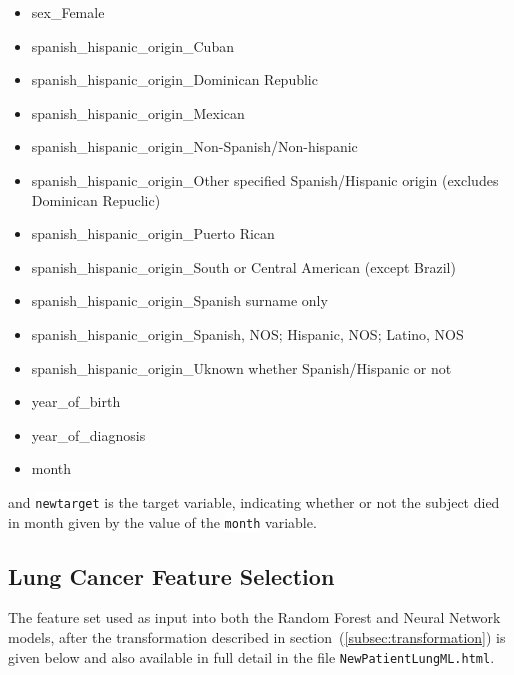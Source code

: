 \documentclass[a4paper,11pt]{article}
\newcommand{\codewhite}[1]{\colorbox{white}{\texttt{#1}}}
\begin{document}
\begin{itemize}[noitemsep]
\item sex\_Female
\item spanish\_hispanic\_origin\_Cuban
\item spanish\_hispanic\_origin\_Dominican Republic
\item spanish\_hispanic\_origin\_Mexican
\item spanish\_hispanic\_origin\_Non-Spanish/Non-hispanic
\item spanish\_hispanic\_origin\_Other specified Spanish/Hispanic origin (excludes Dominican Repuclic)
\item spanish\_hispanic\_origin\_Puerto Rican
\item spanish\_hispanic\_origin\_South or Central American (except Brazil)
\item spanish\_hispanic\_origin\_Spanish surname only
\item spanish\_hispanic\_origin\_Spanish, NOS; Hispanic, NOS; Latino, NOS
\item spanish\_hispanic\_origin\_Uknown whether Spanish/Hispanic or not
\item year\_of\_birth
\item year\_of\_diagnosis
\item month
\end{itemize}

and 
\codewhite{newtarget} is the target variable, indicating whether or not the subject died in month given by the value of the \codewhite{month} variable.

\subsection{Lung Cancer Feature Selection}
\label{subsec:lungfeatures}

The feature set used as input into both the Random Forest and Neural Network models, after the transformation described in section~(\ref{subsec:transformation}) is given below and also available in full detail in the file 
\codewhite{NewPatientLungML.html}.
\end{document}
